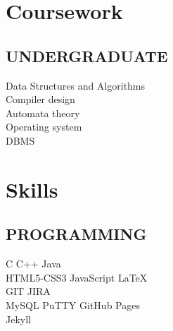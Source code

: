 \documentclass[]{deedy-resume-openfont}
\begin{document}
\begin{minipage}[t]{0.33\textwidth}
\sectionsep


\section{Coursework}
\subsection{UNDERGRADUATE}
Data Structures and Algorithms\\
Compiler design \\
Automata theory\\
Operating system\\
DBMS\\

\sectionsep


\section{Skills}
\subsection{PROGRAMMING}
C \textbullet{} C++ \textbullet{} Java \\
HTML5-CSS3 \textbullet{} JavaScript \textbullet{} \LaTeX\ \\
GIT \textbullet{} JIRA\\
MySQL \textbullet{} PuTTY \textbullet{} GitHub Pages\\
\textbullet{} Jekyll

\sectionsep

%
%

\end{minipage} 
\hfill
\end{document}
